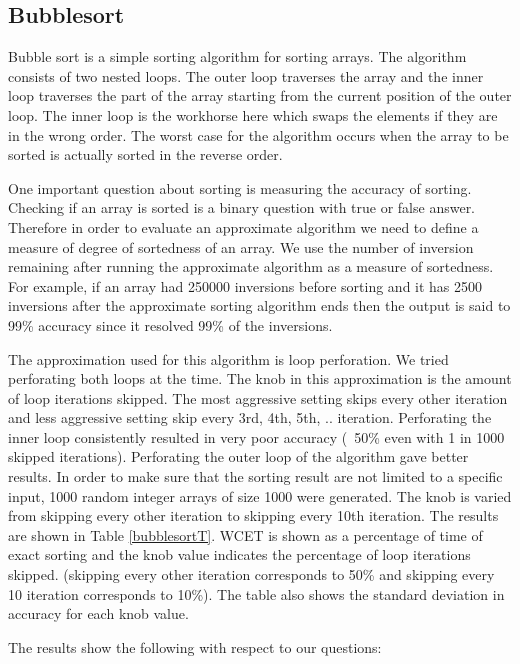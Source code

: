 \subsection{Bubblesort}
Bubble sort is a simple sorting algorithm for sorting arrays. The algorithm consists of two nested loops. The outer loop traverses the array and the inner loop traverses the part of the array starting from the current position of the outer loop. The inner loop is the workhorse here which swaps the elements if they are in the wrong order. The worst case for the algorithm occurs when the array to be sorted is actually sorted in the reverse order.

One important question about sorting is measuring the accuracy of sorting. Checking if an array is sorted is a binary question with true or false answer. Therefore in order to evaluate an approximate algorithm we need to define a measure of degree of sortedness of an array. We use the number of inversion remaining after running the approximate algorithm as a measure of sortedness. For example, if an array had 250000 inversions before sorting and it has 2500 inversions after the approximate sorting algorithm ends then the output is said to 99\% accuracy since it resolved 99\% of the inversions.

The approximation used for this algorithm is loop perforation. We tried perforating both loops at the time. The knob in this approximation is the amount of loop iterations skipped. The most aggressive setting skips every other iteration and less aggressive setting skip every 3rd, 4th, 5th, .. iteration. Perforating the inner loop consistently resulted in very poor accuracy (~50\% even with 1 in 1000 skipped iterations). Perforating the outer loop of the algorithm gave better results. In order to make sure that the sorting result are not limited to a specific input, 1000 random integer arrays of size 1000 were generated. The knob is varied from skipping every other iteration to skipping every 10th iteration. The results are shown in Table \ref{bubblesortT}. WCET is shown as a percentage of time of exact sorting and the knob value indicates the percentage of loop iterations skipped. (skipping every other iteration corresponds to 50\% and skipping every 10 iteration corresponds to 10\%). The table also shows the standard deviation in accuracy for each knob value.



The results show the following with respect to our questions:

